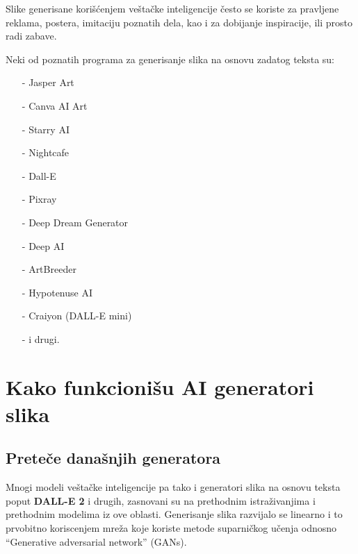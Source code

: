 \documentclass[12pt, letterpaper]{article}
\begin{document}
Slike generisane korišćenjem veštačke inteligencije često se koriste za pravljene reklama, postera, imitaciju poznatih dela, kao i za dobijanje inspiracije, ili prosto radi zabave.  

  

Neki od poznatih programa za generisanje slika na osnovu zadatog teksta su: 

\begin{itemize} 

\item[-] Jasper Art 

\item[-] Canva AI Art 

\item[-] Starry AI 

\item[-] Nightcafe 

\item[-] Dall-E 

\item[-] Pixray 

\item[-] Deep Dream Generator 

\item[-] Deep AI 

\item[-] ArtBreeder 

\item[-] Hypotenuse AI 

\item[-] Craiyon (DALL-E mini) 

\item[-] i drugi. 

\end{itemize} 

\cite{kljucTri} 

\pagebreak
\section{Kako funkcionišu AI generatori slika}
\subsection*{Preteče današnjih generatora}
Mnogi modeli veštačke inteligencije pa tako i generatori slika na osnovu teksta poput \textbf{DALL-E 2} i drugih, zasnovani su na prethodnim istraživanjima i prethodnim modelima iz ove oblasti.
Generisanje slika razvijalo se linearno i to prvobitno koriscenjem mreža koje koriste metode suparničkog učenja odnosno “Generative adversarial network” (GANs).
\end{document}
